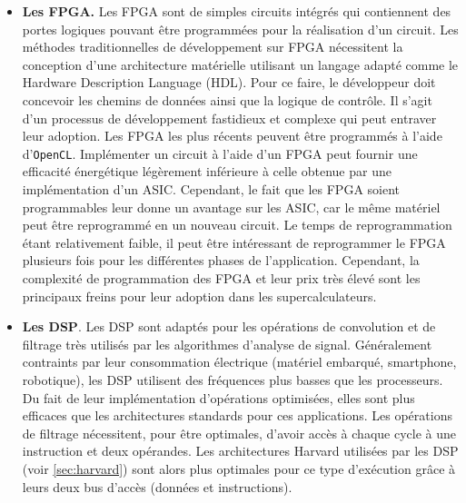 \begin{enumerate}
\begin{itemize}
                    \item\textbf{Les FPGA.}  Les \gls{FPGA} sont de simples circuits intégrés qui contiennent des portes logiques pouvant être programmées pour la réalisation d'un circuit. 
                    Les méthodes traditionnelles de développement sur FPGA nécessitent la conception d'une architecture matérielle utilisant un langage adapté comme le Hardware Description Language (HDL). Pour ce faire, le développeur doit concevoir les chemins de données ainsi que la logique de contrôle. Il s'agit d'un processus de développement fastidieux et complexe qui peut entraver leur adoption. Les FPGA les plus récents peuvent être programmés à l'aide d'\verb|OpenCL|.
                    Implémenter un circuit à l'aide d'un FPGA peut fournir une efficacité énergétique légèrement inférieure à celle obtenue par une implémentation d'un \gls{ASIC}. Cependant, le fait que les FPGA soient programmables leur donne un avantage sur les ASIC, car le même matériel peut être reprogrammé en un nouveau circuit. Le temps de reprogrammation étant relativement faible, il peut être intéressant de reprogrammer le FPGA plusieurs fois pour les différentes phases de l'application. Cependant, la complexité de programmation des FPGA et leur prix très élevé sont les principaux freins pour leur adoption dans les supercalculateurs.        
                    
                    \item\textbf{Les DSP}. Les \gls{DSP} sont adaptés pour les opérations de convolution et de filtrage très utilisés par les algorithmes d'analyse de signal. Généralement contraints par leur consommation électrique (matériel embarqué, smartphone, robotique), les DSP utilisent des fréquences plus basses que les processeurs. Du fait de leur implémentation d'opérations optimisées, elles sont plus efficaces que les architectures standards pour ces applications. Les opérations de filtrage nécessitent, pour être optimales, d'avoir accès à chaque cycle à une instruction et deux opérandes. Les architectures Harvard utilisées par les DSP (voir \autoref{sec:harvard}) sont alors plus optimales pour ce type d'exécution grâce à leurs deux bus d'accès (données et instructions).
                     
             \end{itemize}
             

\end{enumerate}
